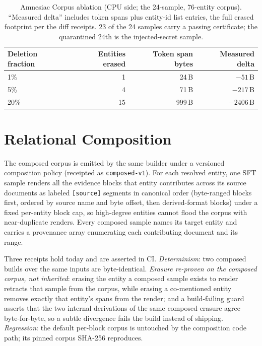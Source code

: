 \documentclass{article}
\begin{document}
\begin{table}[t]
\centering
\caption{Amnesiac Corpus ablation (CPU side; the 24-sample, 76-entity corpus). ``Measured delta'' includes token spans plus entity-id list entries, the full erased footprint per the diff receipts. 23 of the 24 samples carry a passing certificate; the quarantined 24th is the injected-secret sample.}
\label{tab:erasure}
\scriptsize
\begin{tabular}{lrrr}
\toprule
Deletion fraction & Entities erased & Token span bytes & Measured delta \\
\midrule
1\% & 1 & 24\,B & $-51$\,B \\
5\% & 4 & 71\,B & $-217$\,B \\
20\% & 15 & 999\,B & $-2406$\,B \\
\bottomrule
\end{tabular}
\end{table}

\section{Relational Composition}
\label{sec:composition}

The composed corpus is emitted by the same builder under a versioned composition policy (receipted as \texttt{composed-v1}). For each resolved entity, one SFT sample renders all the evidence blocks that entity contributes across its source documents as labeled \texttt{[source]} segments in canonical order (byte-ranged blocks first, ordered by source name and byte offset, then derived-format blocks) under a fixed per-entity block cap, so high-degree entities cannot flood the corpus with near-duplicate renders. Every composed sample names its target entity and carries a provenance array enumerating each contributing document and its range.

Three receipts hold today and are asserted in CI. \emph{Determinism}: two composed builds over the same inputs are byte-identical. \emph{Erasure re-proven on the composed corpus, not inherited}: erasing the entity a composed sample exists to render retracts that sample from the corpus, while erasing a co-mentioned entity removes exactly that entity's spans from the render; and a build-failing guard asserts that the two internal derivations of the same composed erasure agree byte-for-byte, so a subtle divergence fails the build instead of shipping. \emph{Regression}: the default per-block corpus is untouched by the composition code path; its pinned corpus SHA-256 reproduces.
\end{document}
